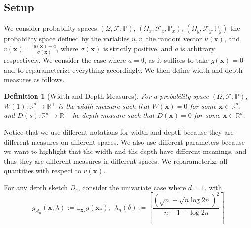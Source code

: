 \documentclass{article} %
\newtheorem{definition}{Definition}[section]
\theoremstyle{remark}
\theoremstyle{definition}      %
\begin{document}
\subsection{Setup} We consider probability spaces $(\Omega,\mathcal{F},\mathbb{P})$,  $(\Omega_x,\mathcal{F}_x,\mathbb{P}_x)$, $(\Omega_y,\mathcal{F}_y,\mathbb{P}_y)$ the probability space defined by the variables $u,v$, the random vector $u(\bm{x})$, and  $v(\bm{x}) = \frac{u(\bm{x}) - a}{\sigma(\bm{x})}$, where $\sigma(\bm{x})$ is strictly positive, and $a$ is arbitrary, respectively. We consider the case where $a = 0$, as it suffices to take $g(\bm{x}) = 0$ and to reparameterize everything accordingly. We then define width and depth measures as follows.
\begin{definition}[Width and Depth Measures] \label{def:w_d}
    For a probability space $(\Omega,\mathcal{F},\mathbb{P})$, $W(1) : \mathbb{R}^d \rightarrow \mathbb{R}^+$ is the width measure such that $W(\bm{x}) = 0$ for some  $\bm{x} \in \mathbb{R}^d$, and $D(s) : \mathbb{R}^d \rightarrow \mathbb{R}^+$ the depth measure such that $D(\bm{x})= 0$ for some  $\bm{x} \in \mathbb{R}^d$.
\end{definition}
Notice that we use different notations for width and depth because they are different measures on different spaces. We also use different parameters because we want to highlight that the width and the depth have different meanings, and thus they are different measures in different spaces. We reparameterize all quantities with respect to $v(\bm{x})$. 
\begin{lemma}
\label{lem:w_d}
  For any depth sketch $D_s$, consider the univariate case where $d=1$, with 
  \begin{equation}
    g_{\mathcal{A}_n}(\bm{x},\lambda) := \mathbb{E}_{\bm{x}_*} g(\bm{x}_*),~~\lambda_{n}(\delta) := \left\lceil \frac{(\sqrt{n} - \sqrt{n \log 2n})^2}{n - 1 - \log 2n} \right\rceil
\end{equation}
\end{lemma}
\end{document}
